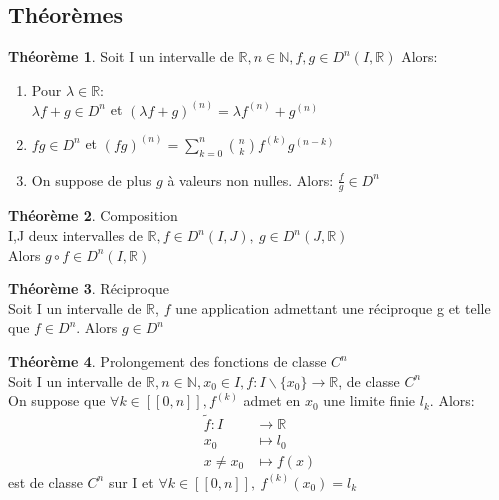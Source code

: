 \documentclass[fleqn]{article}
\theoremstyle{definition} \newtheorem*{defi}{D\'efinition}
\theoremstyle{definition} \newtheorem*{theo}{Th\'eor\`eme}
\theoremstyle{remark} \newtheorem*{rqs}{Remarques}
\theoremstyle{definition} \newtheorem*{prop}{Propri\'et\'e}
\begin{document}
\subsection{Th\'eor\`emes}
\begin{theo}
	Soit I un intervalle de $\mathbb{R}, n \in \mathbb{N}, f,g \in D^n(I, \mathbb{R})$ Alors:
	\begin{enumerate}
		\item Pour $\lambda \in \mathbb{R}$: \\
			$\lambda f + g \in D^n$ et $(\lambda f + g)^{(n)} = \lambda f^{(n)} + g^{(n)}$
		\item $fg \in D^n$ et $(fg)^{(n)} = \sum_{k=0}^{n} \binom{n}{k} f^{(k)} g ^{(n-k)}$
		\item On suppose de plus $g$ \`a valeurs non nulles. Alors: $\frac{f}{g} \in D^n$
	\end{enumerate}
\end{theo}

\begin{theo} Composition\\
	I,J deux intervalles de $\mathbb{R}, f \in D^n(I, J),\ g \in D^n(J, \mathbb{R})$\\
	Alors $g \circ f \in D^n(I, \mathbb{R})$
\end{theo}

\begin{theo} R\'eciproque\\
	Soit I un intervalle de $\mathbb{R}$, $f$ une application admettant une r\'eciproque g et telle que $f \in D^n$. Alors $g \in D^n$
\end{theo}

\begin{theo} Prolongement des fonctions de classe $C^n$\\
	Soit I un intervalle de $\mathbb{R}, n \in \mathbb{N}, x_0 \in I, f:I\backslash\{x_0\} \rightarrow \mathbb{R}$, de classe $C^n$ \\
	On suppose que $\forall k \in [\![0,n]\!], f^{(k)}$ admet en $x_0$ une limite finie $l_k$. Alors:
	\begin{align*}
		\tilde{f}: I &\rightarrow \mathbb{R}\\
		x_0 &\mapsto l_0\\
		x \neq x_0 &\mapsto f(x)
	\end{align*}
	est de classe $C^n$ sur I et $\forall k \in [\![0,n]\!],\ f^{(k)}(x_0) = l_k$
\end{theo}

\end{document}
